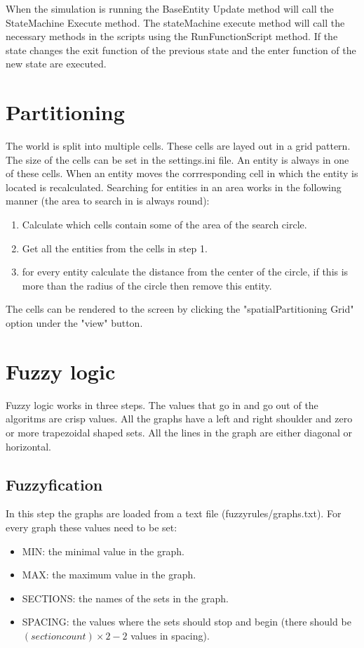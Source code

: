 \documentclass{article}
\begin{document}
   When the simulation is running the BaseEntity Update method will call the StateMachine Execute method. The stateMachine execute method will call the necessary methods in the scripts using the RunFunctionScript method. If the state changes the exit function of the previous state and the enter function of the new state are executed.
   
   \newpage
   \section {Partitioning}
   The world is split into multiple cells. These cells are layed out in a grid pattern. The size of the cells can be set in the settings.ini file. An entity is always in one of these cells. When an entity moves the corrresponding cell in which the entity is located is recalculated. Searching for entities in an area works in the following manner (the area to search in is always round):
   \begin{enumerate}
   \item Calculate which cells contain some of the area of the search circle.
   \item Get all the entities from the cells in step 1.
   \item for every entity calculate the distance from the center of the circle, if this is more than the radius of the circle then remove this entity.
   \end{enumerate}
   The cells can be rendered to the screen by clicking the "spatialPartitioning Grid" option under the "view" button. 
   
    \newpage
   \section {Fuzzy logic}
   Fuzzy logic works in three steps. The values that go in and go out of the algoritms are crisp values. All the graphs have a left and right shoulder and zero or more trapezoidal shaped sets. All the lines in the graph are either diagonal or horizontal.
   \subsection{Fuzzyfication}
   In this step the graphs are loaded from a text file (fuzzyrules/graphs.txt). For every graph these values need to be set: 
   \begin{itemize}
   \item MIN: the minimal value in the graph.
   \item MAX: the maximum value in the graph.
   \item SECTIONS: the names of the sets in the graph.
   \item SPACING: the values where the sets should stop and begin (there should be \( (section count) \times 2 - 2\) values in spacing).
   \end{itemize}
\end{document}
